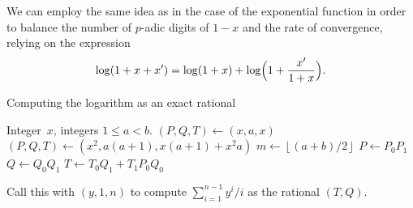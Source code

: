 \documentclass[a4paper,11pt]{article}
\theoremstyle{definition}
\providecommand{\floor}[1]{\left\lfloor#1\right\rfloor}%
\begin{document}
We can employ the same idea as in the case of the exponential 
function in order to balance the number of $p$-adic digits of $1 - x$ 
and the rate of convergence, relying on the expression 
\begin{equation}
\log(1 + x + x') = \log(1 + x) + \log \Bigl(1 + \frac{x'}{1+x}\Bigr).
\end{equation}

\begin{algorithm}
\caption{Computing the  logarithm as an exact rational}
\label{alg:log-bsplit}
\begin{algorithmic}
\vspace{1mm}
\Require Integer~$x$, integers $1 \leq a < b$.
\State $(P, Q, T) \gets (x, a, x)$
\State $(P, Q, T) \gets (x^2, a (a + 1), x (a + 1) + x^2 a)$
\Else
\State $m \gets \floor{(a + b) / 2}$
\State {}
\State {}
\State $P \gets P_0 P_1$
\State $Q \gets Q_0 Q_1$
\State $T \gets T_0 Q_1 + T_1 P_0 Q_0$
\EndIf
\EndProcedure
\end{algorithmic}
\end{algorithm}

Call this with $(y, 1, n)$ to compute $\sum_{i=1}^{n-1} y^i / i$ 
as the rational $(T, Q)$.
\end{document}
